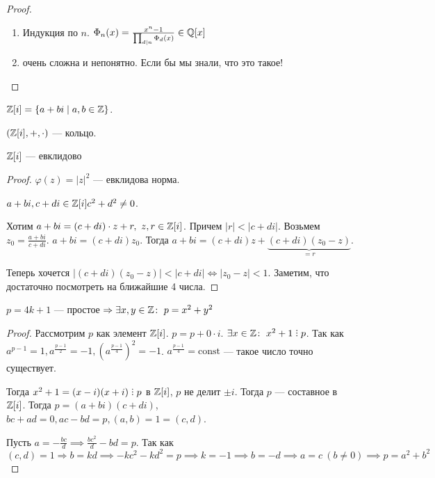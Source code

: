 \begin{proof}
    \begin{enumerate}
        \item Индукция по $n$.  $\Phi_n(x) = \frac{x^n - 1}{\prod_{d \mid n}\Phi_d(x)} \in \mathbb{Q}[x]$
        \item очень сложна и непонятно. Если бы мы знали, что это такое!
    \end{enumerate}
\end{proof}
\begin{definition}
    $\mathbb{Z}[i] = \{a + bi \mid a, b \in \mathbb{Z}\}$.
\end{definition}
\begin{statement}
    $(\mathbb{Z}[i], +, \cdot)$ --- кольцо.
\end{statement}
\begin{theorem}
    $\mathbb{Z}[i]$ --- евклидово
\end{theorem}
\begin{proof}
    $\varphi(z) = |z|^2$ --- евклидова норма.

    $a+bi, c+di \in \mathbb{Z}[i] c^2 + d^2 \neq 0$. 

    Хотим  $a+bi=(c+di)\cdot z +r,\ z,r \in \mathbb{Z}[i]$. Причем $|r| < |c+di|$. Возьмем  $z_0 = \frac{a+bi}{c+di}$. $a+bi = (c+di)z_0$. Тогда  $a+bi = (c+di)z + \underbrace{(c+di)(z_0-z)}_{=r}$. 

    Теперь хочется  $|(c+di)(z_0-z)| < |c+di| \iff |z_0 - z| < 1$. Заметим, что достаточно посмотреть на ближайшие 4 числа.
\end{proof}

\begin{theorem}
    $p = 4k + 1$ --- простое  $\Rightarrow \exists x, y \in \Z\!:\ p = x^2+y^2$
\end{theorem}
\begin{proof}
    Рассмотрим $p$ как элемент  $\mathbb{Z}[i]$.  $p = p + 0 \cdot i$.  $\exists x \in \Z\!:\ x^2 + 1 \divby p$. Так как  $a^{p-1} = 1, a^{\frac{p - 1}{2}} = -1, (a^{\frac{p-1}{4}})^2 = -1$. $a^{\frac{p-1}{4}} = \text{const}$ --- такое число точно существует.

    Тогда $x^2+1 = (x-i)(x+i) \divby p$ в  $\mathbb{Z}[i]$, $p$ не делит  $\pm i$. Тогда  $p$ --- составное в  $\mathbb{Z}[i]$. Тогда  $p = (a+bi)(c+di)$,  $bc + ad = 0, ac - bd = p, (a, b) = 1 = (c, d)$. 

    Пусть $a = - \frac{bc}{d} \implies \frac{bc^2}{d} - bd = p$. Так как $(c, d) = 1 \Rightarrow b = kd \implies -kc^2 - kd^2 = p \implies k = -1 \implies b = -d \implies a = c\ (b \neq 0) \implies p = a^2 + b^2$
\end{proof}
